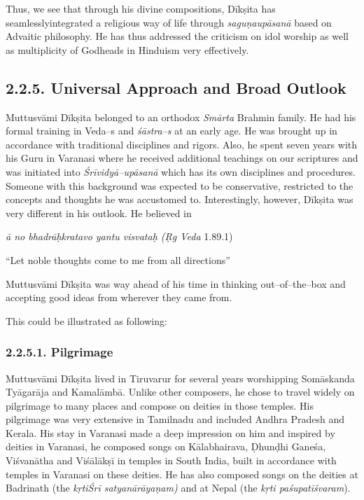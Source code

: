 Thus, we see that through his divine compositions, Dīkṣita has seamlesslyintegrated a religious way of life through \textit{saguṇaupāsanā} based on Advaitic philosophy. He has thus addressed the criticism on idol worship as well as multiplicity of Godheads in Hinduism very effectively.


\subsection*{2.2.5. Universal Approach and Broad Outlook}

Muttusvāmi Dīkṣita belonged to an orthodox \textit{Smārta} Brahmin family. He had his formal training in Veda–s and \textit{śāstra–s} at an early age. He was brought up in accordance with traditional disciplines and rigors. Also, he spent seven years with his Guru in Varanasi where he received additional teachings on our scriptures and was initiated into \textit{Śrīvidyā–upāsanā} which has its own disciplines and procedures. Someone with this background was expected to be conservative, restricted to the concepts and thoughts he was accustomed to. Interestingly, however, Dīkṣita was very different in his outlook. He believed in

\begin{myquote}
\textit{ā no bhadrāḥkratavo yantu visvataḥ (Ṛg Veda} 1.89.1)
\end{myquote}

“Let noble thoughts come to me from all directions”

Muttusvāmi Dīkṣita was way ahead of his time in thinking out–of–the–box and accepting good ideas from wherever they came from.

This could be illustrated as following:

\subsubsection*{2.2.5.1. Pilgrimage}

Muttusvāmi Dīkṣita lived in Tiruvarur for several years worshipping Somāskanda Tyāgarāja and Kamalāmbā. Unlike other composers, he chose to travel widely on pilgrimage to many places and compose on deities in those temples. His pilgrimage was very extensive in Tamilnadu and included Andhra Pradesh and Kerala. His stay in Varanasi made a deep impression on him and inspired by deities in Varanasi, he composed songs on Kālabhairava, Ḍhunḍhi Ganeśa, Viśvanātha and Viśālākṣī in temples in South India, built in accordance with temples in Varanasi on these deities. He has also composed songs on the deities at Badrinath (the \textit{kṛtiŚrī satyanārāyaṇam)} and at Nepal (the\textit{ kṛti paśupatīśvaram}).

